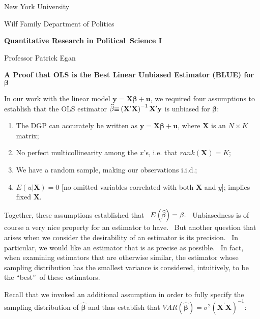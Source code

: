 \documentclass[11pt]{article}
\begin{document}
New York University

Wilf Family Department of Politics

\begin{center}
{\large \textbf{Quantitative Research in Political\ Science I}}

Professor Patrick Egan

\bigskip

\textbf{A Proof that OLS is the Best Linear Unbiased Estimator (BLUE) for }$%
\mathbf{\beta }$\bigskip 
\end{center}

In our work with the linear model $\mathbf{y}=\mathbf{X\beta }+\mathbf{u}$,
we required four {\small assumptions to establish that the OLS estimator }$%
\widehat{\mathbf{\beta }}{\small \equiv }\left( \mathbf{X}^{\prime }\mathbf{X%
}\right) ^{-1}\mathbf{X}^{\prime }\mathbf{y}$ is unbiased for $\mathbf{\beta
:}$

\begin{enumerate}
\item The DGP can accurately be written as $\mathbf{y}=\mathbf{X\beta }+%
\mathbf{u}$, where $\mathbf{X}$ is an $N\times K$ matrix;

\item No perfect multicollinearity among the $x$'s, i.e. that $rank\left( 
\mathbf{X}\right) =K$;

\item {\small We have a random sample, making our observations i.i.d.;}

\item $E\left( u|\mathbf{X}\right) =0$ [no omitted variables correlated with
both $\mathbf{X}$ and $y$]; implies fixed $\mathbf{X.}$\bigskip 
\end{enumerate}

Together, these assumptions established that {\small \ }${\small E}\left( 
\widehat{\mathbf{\beta }}\right) =\mathbf{\beta .}$ \ Unbiasedness is of
course a very nice property for an estimator to have. \ But another question
that arises when we consider the desirability of an estimator is its
precision. \ In particular, we would like an estimator that is as precise as
possible. \ In fact, when examining estimators that are otherwise similar,
the estimator whose sampling distribution has the smallest variance is
considered, intuitively, to be the \textquotedblleft best\textquotedblright\
of these estimators. \ 

Recall that we invoked an additional assumption in order to fully specify
the sampling distribution of $\widehat{\mathbf{\beta }}$ and thus establish
that $VAR\left( \widehat{\mathbf{\beta }}\right) =\sigma ^{2}\left( \mathbf{X%
}^{\prime }\mathbf{X}\right) ^{-1}$: \ 
\end{document}

